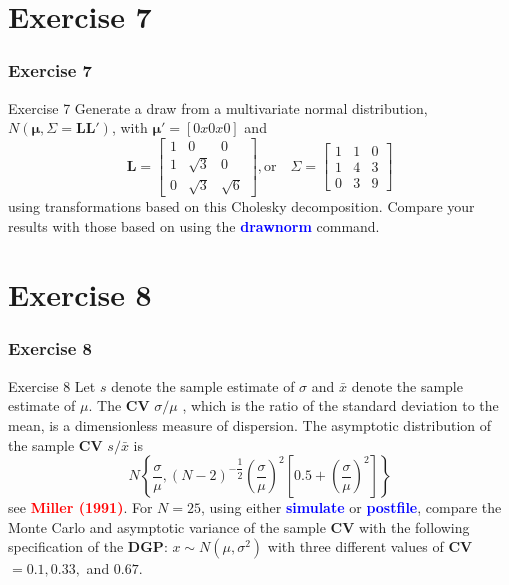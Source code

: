 \documentclass[11pt, aspectratio=169]{beamer}
\begin{document}
	\section{Exercise 7}
		\begin{frame}
			\frametitle{Exercise 7}
			\begin{block}{Exercise 7}
				Generate a draw from a multivariate normal distribution,
				$N(\mathbf{\mu}, \Sigma = \mathbf{LL'})$, with $\mathbf{\mu'} = [0x0x0]$ and 
					\begin{equation}
						\mathbf{L} = \left[
							\begin{matrix}
								1 & 0 & 0 \\
								1 & \sqrt{3} & 0\\
								0 & \sqrt{3} & \sqrt{6}
							\end{matrix}
						\right], \text{or}\quad \Sigma = \left[
							\begin{matrix}
								1 & 1 & 0 \\
								1 & 4 & 3 \\
								0 & 3 & 9
							\end{matrix}
						\right]
					\end{equation}
				using transformations based on this Cholesky decomposition. Compare
				your results with those based on using the \textcolor{blue}{\textbf{drawnorm}} command.
			\end{block}
		\end{frame}
	\section{Exercise 8}
		\begin{frame}[t]
			\frametitle{Exercise 8}
			\begin{block}{Exercise 8}
				Let $s$ denote the sample estimate of $\sigma$ and $\bar{x}$ denote the sample
				estimate of $\mu$. The \textbf{CV} $\sigma/\mu$ , which is the ratio of the standard deviation
				to the mean, is a dimensionless measure of dispersion. The asymptotic
				distribution of the sample \textbf{CV} $s/\bar{x}$ is 
					\begin{equation}
						N\left\{\dfrac{\sigma}{\mu} , \left(N-2\right)^{-\dfrac{1}{2}}\left(\dfrac{\sigma}{\mu}\right)^{2}\left[ 0.5 + \left(\dfrac{\sigma}{\mu}\right)^{2}  \right] \right\}       
					\end{equation}
				see \textcolor{red}{\textbf{Miller (1991)}}. For $N = 25$, using either \textcolor{blue}{\textbf{simulate}} or \textcolor{blue}{\textbf{postfile}}, compare the Monte Carlo
				and asymptotic variance of the sample \textbf{CV} with the following
				specification of the \textbf{DGP}: $x \sim N(\mu, \sigma^{2})$ with three different values of
				\textbf{CV} $= 0.1 , 0.33,$ and $0.67$.
			\end{block}
		\end{frame}
\end{document}
